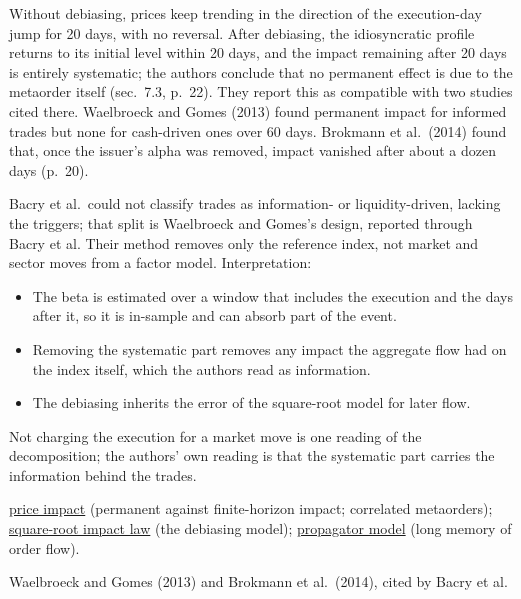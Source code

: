 \begin{qfmethod}
 Without debiasing, prices keep trending in the direction of the execution-day jump for 20 days, with no reversal. After debiasing, the idiosyncratic profile returns to its initial level within 20 days, and the impact remaining after 20 days is entirely systematic; the authors conclude that no permanent effect is due to the metaorder itself (sec.~7.3, p.~22). They report this as compatible with two studies cited there. Waelbroeck and Gomes (2013) found permanent impact for informed trades but none for cash-driven ones over 60 days. Brokmann et al.\ (2014) found that, once the issuer's alpha was removed, impact vanished after about a dozen days (p.~20).

 Bacry et al.\ could not classify trades as information- or liquidity-driven, lacking the triggers; that split is Waelbroeck and Gomes's design, reported through Bacry et al. Their method removes only the reference index, not market and sector moves from a factor model. Interpretation:
\begin{itemize}
\item The beta is estimated over a window that includes the execution and the days after it, so it is in-sample and can absorb part of the event.
\item Removing the systematic part removes any impact the aggregate flow had on the index itself, which the authors read as information.
\item The debiasing inherits the error of the square-root model for later flow.
\end{itemize}
Not charging the execution for a market move is one reading of the decomposition; the authors' own reading is that the systematic part carries the information behind the trades.

 \hyperref[def:price-impact]{price impact} (permanent against finite-horizon impact; correlated metaorders); \hyperref[ev:square-root-impact]{square-root impact law} (the debiasing model); \hyperref[mod:propagator]{propagator model} (long memory of order flow).

 Waelbroeck and Gomes (2013) and Brokmann et al.\ (2014), cited by Bacry et al.

\end{qfmethod}

